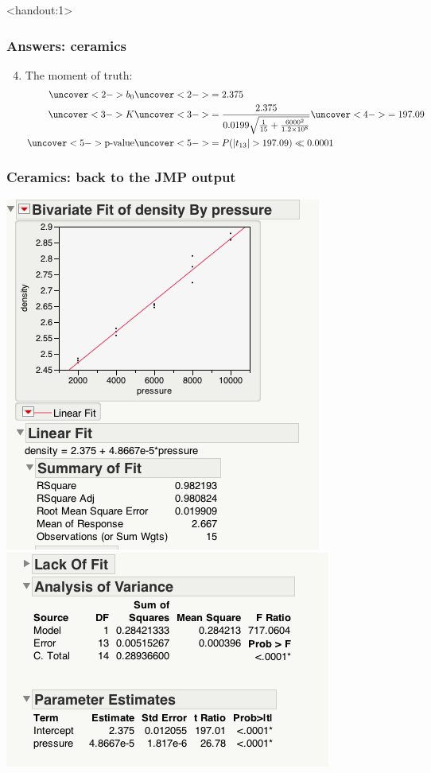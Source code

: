 \documentclass[handout]{beamer}\usepackage{graphicx, color}
\newcommand{\answers}{1}
\numberwithin{equation}{section}
\begin{document}
\begin{frame}<handout:\answers>
\frametitle{Answers: ceramics}
\begin{enumerate}[1. ]
\setcounter{enumi}{3}
\item The moment of truth:
\begin{align*}
\uncover<2->{b_0} & \uncover<2->{= 2.375} \\
\uncover<3->{K} & \uncover<3->{= \frac{2.375}{0.0199 \sqrt{ \frac{1}{15} + \frac{6000^2}{1.2 \times 10^8}}}} \uncover<4->{ = 197.09} \\
\uncover<5->{\text{p-value}} &\uncover<5->{= P(|t_{13}| > 197.09) \ll 0.0001}
\end{align*}
\end{enumerate}
\end{frame}

\begin{frame}
\frametitle{Ceramics: back to the JMP output}
\begin{center}
 \includegraphics{../../fig/jmpcer1.png}
 \includegraphics{../../fig/jmpcer2.png}
\end{center}
\end{frame}
\end{document}
